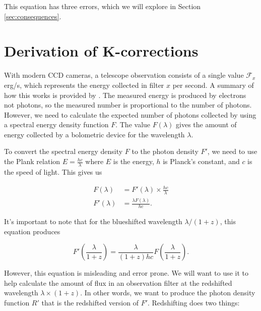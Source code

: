 \documentclass{article}
\begin{document}
This equation has three errors, which we will explore in Section
\ref{sec:consequences}.

\section{Derivation of K-corrections}
\label{sec:derivation}

With modern CCD cameras, a telescope observation consists of a single value
$\mathcal{F}_x$ erg/s, which represents the energy collected in filter $x$ per
second. A summary of how this works is provided by \citet{lesser2015}. The
measured energy is produced by electrons not photons, so the measured number is
proportional to the number of photons. However, we need to calculate the
expected number of photons collected by using a spectral energy density
function $F$. The value $F(\lambda)$ gives the amount of energy collected by a
bolometric device for the wavelength $\lambda$.

To convert the spectral energy density $F$ to the photon density $F'$, we need
to use the Plank relation $E = \frac{hc}{\lambda}$ where $E$ is the energy, $h$
is Planck's constant, and $c$ is the speed of light. This gives us

\begin{equation}
\begin{aligned}
   F(\lambda) &= F'(\lambda) \times \frac{hc}{\lambda} \\
  F'(\lambda) &= \frac{\lambda F(\lambda)}{hc}.
\end{aligned}
\end{equation}

It's important to note that for the blueshifted wavelength $\lambda / (1+z)$,
this equation produces

\begin{equation}
 F'\left(\frac{\lambda}{1+z}\right) = \frac{\lambda}{(1+z)hc} F\left(\frac{\lambda}{1+z}\right).
\end{equation}

However, this equation is misleading and error prone. We will want to use it to
help calculate the amount of flux in an observation filter at the redshifted
wavelength $\lambda \times (1 + z)$. In other words, we want to produce the
photon density function $R'$ that is the redshifted version of $F'$.
Redshifting does two things:
\end{document}
